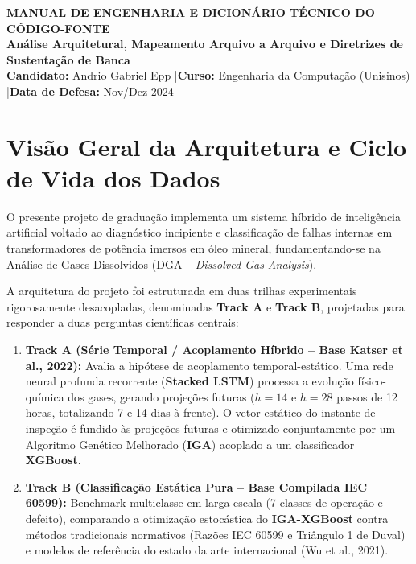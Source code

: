 \documentclass[10pt,a4paper]{article}
\begin{document}
\begin{center}
  {\Large\textbf{\textsf{\color{NavyBlue}MANUAL DE ENGENHARIA E DICIONÁRIO TÉCNICO DO CÓDIGO-FONTE}}}\\[2pt]
  {\large\textbf{\textsf{Análise Arquitetural, Mapeamento Arquivo a Arquivo e Diretrizes de Sustentação de Banca}}}\\[4pt]
  \textbf{Candidato:} Andrio Gabriel Epp \quad|\quad \textbf{Curso:} Engenharia da Computação (Unisinos) \quad|\quad \textbf{Data de Defesa:} Nov/Dez 2024
\end{center}

\vspace{-6pt}
\noindent\makebox[\linewidth]{\rule{\textwidth}{1.2pt}}

\section{Visão Geral da Arquitetura e Ciclo de Vida dos Dados}

O presente projeto de graduação implementa um sistema híbrido de inteligência artificial voltado ao diagnóstico incipiente e classificação de falhas internas em transformadores de potência imersos em óleo mineral, fundamentando-se na Análise de Gases Dissolvidos (DGA -- \textit{Dissolved Gas Analysis}).

A arquitetura do projeto foi estruturada em duas trilhas experimentais rigorosamente desacopladas, denominadas \textbf{Track A} e \textbf{Track B}, projetadas para responder a duas perguntas científicas centrais:
\begin{enumerate}[leftmargin=*,itemsep=1pt]
  \item \textbf{Track A (Série Temporal / Acoplamento Híbrido -- Base Katser et al., 2022):} Avalia a hipótese de acoplamento temporal-estático. Uma rede neural profunda recorrente (\textbf{Stacked LSTM}) processa a evolução físico-química dos gases, gerando projeções futuras ($h=14$ e $h=28$ passos de 12 horas, totalizando 7 e 14 dias à frente). O vetor estático do instante de inspeção é fundido às projeções futuras e otimizado conjuntamente por um Algoritmo Genético Melhorado (\textbf{IGA}) acoplado a um classificador \textbf{XGBoost}.
  \item \textbf{Track B (Classificação Estática Pura -- Base Compilada IEC 60599):} Benchmark multiclasse em larga escala (7 classes de operação e defeito), comparando a otimização estocástica do \textbf{IGA-XGBoost} contra métodos tradicionais normativos (Razões IEC 60599 e Triângulo 1 de Duval) e modelos de referência do estado da arte internacional (Wu et al., 2021).
\end{enumerate}
\end{document}
